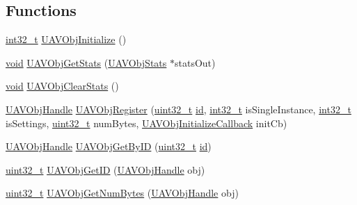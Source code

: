 \subsection*{Functions}
\begin{DoxyCompactItemize}
\item 
\hyperlink{group___n_a_m_e_gafd12020da5a235dfcf0c3c748fb5baed}{int32\-\_\-t} \hyperlink{group___u_a_v_ga07599909613c0729f06c1b4b8a2296af}{U\-A\-V\-Obj\-Initialize} ()
\item 
\hyperlink{group___n_a_m_e_ga18028b8badbf1ea7e704ccac3c488e82}{void} \hyperlink{group___u_a_v_ga6ff4107796c9693e8034e7c77a26f066}{U\-A\-V\-Obj\-Get\-Stats} (\hyperlink{struct_u_a_v_obj_stats}{U\-A\-V\-Obj\-Stats} $\ast$stats\-Out)
\item 
\hyperlink{group___n_a_m_e_ga18028b8badbf1ea7e704ccac3c488e82}{void} \hyperlink{group___u_a_v_gae604f34af94a200b96787f24abb32ce1}{U\-A\-V\-Obj\-Clear\-Stats} ()
\item 
\hyperlink{group___n_a_m_e_gac31715ab50a1903838e7d87c8022ec75}{U\-A\-V\-Obj\-Handle} \hyperlink{group___u_a_v_ga7811803d1e3bc5d56f6b3615dbe9c10f}{U\-A\-V\-Obj\-Register} (\hyperlink{stdint_8h_a435d1572bf3f880d55459d9805097f62}{uint32\-\_\-t} \hyperlink{group___u_a_v_gabaabdc509cdaba7df9f56c6c76f3ae19}{id}, \hyperlink{group___n_a_m_e_gafd12020da5a235dfcf0c3c748fb5baed}{int32\-\_\-t} is\-Single\-Instance, \hyperlink{group___n_a_m_e_gafd12020da5a235dfcf0c3c748fb5baed}{int32\-\_\-t} is\-Settings, \hyperlink{stdint_8h_a435d1572bf3f880d55459d9805097f62}{uint32\-\_\-t} num\-Bytes, \hyperlink{group___u_a_v_ga16def10911b9b7e8626c2d1e3fec6e67}{U\-A\-V\-Obj\-Initialize\-Callback} init\-Cb)
\item 
\hyperlink{group___n_a_m_e_gac31715ab50a1903838e7d87c8022ec75}{U\-A\-V\-Obj\-Handle} \hyperlink{group___u_a_v_ga17a9665c830f577232ad694ab4baaea6}{U\-A\-V\-Obj\-Get\-By\-I\-D} (\hyperlink{stdint_8h_a435d1572bf3f880d55459d9805097f62}{uint32\-\_\-t} \hyperlink{group___u_a_v_gabaabdc509cdaba7df9f56c6c76f3ae19}{id})
\item 
\hyperlink{stdint_8h_a435d1572bf3f880d55459d9805097f62}{uint32\-\_\-t} \hyperlink{group___u_a_v_ga42b0a29d64752bc113864e3ef8f93d2e}{U\-A\-V\-Obj\-Get\-I\-D} (\hyperlink{group___n_a_m_e_gac31715ab50a1903838e7d87c8022ec75}{U\-A\-V\-Obj\-Handle} obj)
\item 
\hyperlink{stdint_8h_a435d1572bf3f880d55459d9805097f62}{uint32\-\_\-t} \hyperlink{group___u_a_v_ga08b602bb9381c3c2806140ed32a5af74}{U\-A\-V\-Obj\-Get\-Num\-Bytes} (\hyperlink{group___n_a_m_e_gac31715ab50a1903838e7d87c8022ec75}{U\-A\-V\-Obj\-Handle} obj)

\end{DoxyCompactItemize}
